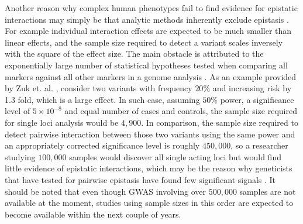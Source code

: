 Another reason why complex human phenotypes fail to find evidence for epistatic interactions may simply be that analytic methods inherently exclude epistasis \cite{culverhouse2002perspective}.
For example individual interaction effects are expected to be much smaller than linear effects, and the sample size required to detect a variant scales inversely with the square of the effect size. 
The main obstacle is attributed to the exponentially large number of statistical hypotheses tested when comparing all markers against all other markers in a genome analysis \cite{ackermann2012systematic}.
As an example provided by Zuk et. al. \cite{zuk2012mystery}, consider two variants with frequency $20\%$ and increasing risk by 1.3 fold, which is a large effect.
In such case, assuming $50\%$ power, a significance level of $5 \times 10^{-8}$  and equal number of cases and controls, the sample size required for single loci analysis would be $4,900$.
In comparison, the sample size required to detect pairwise interaction between those two variants using the same power and an appropriately corrected significance level is roughly $450,000$, so a researcher studying $100,000$ samples would discover all single acting loci but would find little evidence of epistatic interactions, which may be the reason why geneticists that have tested for pairwise epistasis have found few significant signals \cite{zuk2012mystery}.
It should be noted that even though GWAS involving over $500,000$ samples are not available at the moment, studies using sample sizes in this order are expected to become available within the next couple of years.

